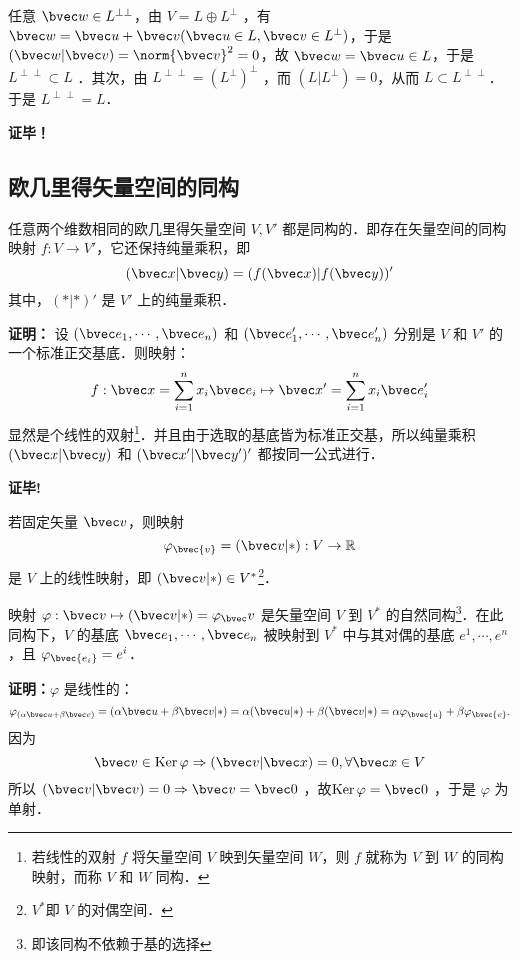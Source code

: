 任意 $\bvec w\in L^{\perp\perp}$，由 $V=L\oplus L^{\perp}$ ，有 $\bvec w=\bvec u+\bvec v(\bvec u\in L,\bvec v\in L^{\perp})$，于是 $(\bvec w|\bvec v)=\norm{\bvec v}^2=0$，故 $\bvec w=\bvec u\in L$，于是 $L^{\perp\perp}\subset L$ ．其次，由 $L^{\perp\perp}=(L^{\perp})^{\perp}$ ，而 $(L|L^{\perp})=0$，从而 $L\subset L^{\perp\perp}$．于是 $L^{\perp\perp}=L$．

\textbf{证毕！}
\subsection{欧几里得矢量空间的同构}
\begin{theorem}{}
任意两个维数相同的欧几里得矢量空间 $V,V'$ 都是同构的．即存在矢量空间的同构映射 $f:V\rightarrow V'$，它还保持纯量乘积，即
\begin{equation}
(\bvec x|\bvec y)=(f(\bvec x)|f(\bvec y))'
\end{equation}
其中，$(*|*)'$ 是 $V'$ 上的纯量乘积．
\end{theorem}
\textbf{证明：} 设 $(\bvec e_1,\cdots,\bvec e_n)$ 和 $(\bvec e'_1,\cdots,\bvec e'_n)$ 分别是 $V$ 和 $V'$ 的一个标准正交基底．则映射：
\begin{equation}
f:\bvec x=\sum_{i=1}^{n}x_i\bvec e_i\mapsto\bvec x'=\sum_{i=1}^{n}x_i\bvec e'_i
\end{equation}
显然是个线性的双射\footnote{若线性的双射 $f$ 将矢量空间 $V$ 映到矢量空间 $W$，则 $f$ 就称为 $V$ 到 $W$ 的同构映射，而称 $V$ 和 $W$ 同构．}．并且由于选取的基底皆为标准正交基，所以纯量乘积 $(\bvec x|\bvec y)$ 和 $(\bvec x'|\bvec y')'$ 都按同一公式进行．

\textbf{证毕!}

若固定矢量 $\bvec v$，则映射
\begin{equation}
\varphi_\bvec{v}=(\bvec v|*):V\rightarrow\mathbb{R}
\end{equation}
是 $V$ 上的线性映射，即 $(\bvec v|*)\in V^*$\footnote{$V^*$即 $V$ 的对偶空间．}．
\begin{theorem}{}
映射 $\varphi:\bvec v\mapsto (\bvec v|*)=\varphi_\bvec v$ 是矢量空间 $V$ 到 $V^*$ 的自然同构\footnote{即该同构不依赖于基的选择}．在此同构下，$V$ 的基底 $\bvec e_1,\cdots,\bvec e_n$ 被映射到 $V^*$ 中与其对偶的基底 $e^1,\cdots,e^n$，且 $\varphi_\bvec{e_i}=e^i$．
\end{theorem}
\textbf{证明：}$\varphi$ 是线性的：
\begin{equation}
\varphi_{(\alpha\bvec u+\beta\bvec v)}=(\alpha\bvec u+\beta\bvec v|*)=\alpha(\bvec u|*)+\beta(\bvec v|*)=\alpha\varphi_\bvec{u}+\beta\varphi_\bvec{v}.
\end{equation}
因为 
\begin{equation}
\bvec v\in \mathrm{Ker}\,\varphi\Rightarrow(\bvec v|\bvec x)=0,\forall\bvec x\in V
\end{equation}
所以 $(\bvec v|\bvec v)=0\Rightarrow\bvec v=\bvec 0$ ，故$\mathrm{Ker}\,\varphi=\bvec 0$ ，于是 $\varphi$ 为单射．

